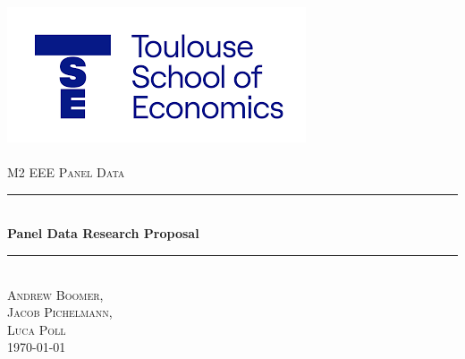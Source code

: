 



\begin{titlepage}

\newcommand{\HRule}{\rule{\linewidth}{0.25mm}} %
\setlength{\topmargin}{-0.5in}
\center %


\includegraphics[scale=0.75]{TSE.png}\\



\\[1.5cm]
\large \textsc{M2 EEE Panel Data} 
\vspace{1.5cm}
\textsc{\large } %



\HRule \\[0.75cm]
{ \huge \bfseries Panel Data Research Proposal}\\[0.5cm] %
\HRule \\[1.75cm]
 


\large\textsc{Andrew Boomer, \\ Jacob Pichelmann, \\Luca Poll} \\[1.5cm]


{\large \today}\\[0.5cm] %

\vfill %

\end{titlepage}


